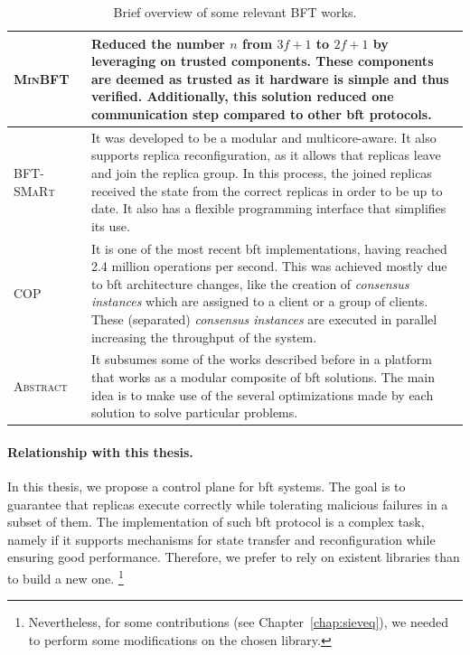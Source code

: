 \begin{table}[h]
\begin{center}
{\begin{tabular}{ p{2.4cm}  p{10.5cm}  }
\textsc{MinBFT}~\cite{Veronese:2013}  & Reduced the number $n$ from $3f+1$ to $2f+1$ by leveraging on trusted components. These components are deemed as trusted as it hardware is simple and thus verified. Additionally, this solution reduced one communication step compared to other \gls{bft} protocols. \\ \hline

\textsc{BFT-SMaRt}~\cite{Bessani:2014} & It was developed to be a modular and multicore-aware. It also supports replica reconfiguration, as it allows that replicas leave and join the replica group. In this process, the joined replicas received the state from the correct replicas in order to be up to date. It also has a flexible programming interface that simplifies its use. \\ \hline

\textsc{COP}~\cite{Behl:2015} & It is one of the most recent \gls{bft} implementations, having reached 2.4 million operations per second. This was achieved mostly due to \gls{bft} architecture changes, like the creation of \emph{consensus instances} which are assigned to a client or a group of clients. These (separated) \emph{consensus instances} are executed in parallel increasing the throughput of the system.\\  \hline  

\textsc{Abstract}~\cite{Aublin:2015} & It subsumes some of the works described before in a platform that works as a modular composite of \gls{bft} solutions. The main idea is to make use of the several optimizations made by each solution to solve particular problems.\\ \hline


\end{tabular}
}
\caption{Brief overview of some relevant BFT works.}

\label{tab:bft}
\end{center}
\end{table}




\paragraph{Relationship with this thesis.} 

In this thesis, we propose a control plane for \gls{bft} systems.
The goal is to guarantee that replicas execute correctly while tolerating malicious failures in a subset of them.
The implementation of such \gls{bft} protocol is a complex task, namely if it supports mechanisms for state transfer and reconfiguration while ensuring good performance.
Therefore, we prefer to rely on existent libraries than to build a new one.
\footnote{Nevertheless, for some contributions (see Chapter~\ref{chap:sieveq}), we needed to perform some modifications on the chosen library.}



